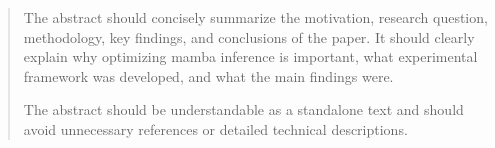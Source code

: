 \begin{abstract}

  The abstract should concisely summarize the motivation, research question, methodology, key findings, and conclusions of the paper. It should clearly explain why optimizing mamba inference is important, what experimental framework was developed, and what the main findings were.

  The abstract should be understandable as a standalone text and should avoid unnecessary references or detailed technical descriptions.

\end{abstract}